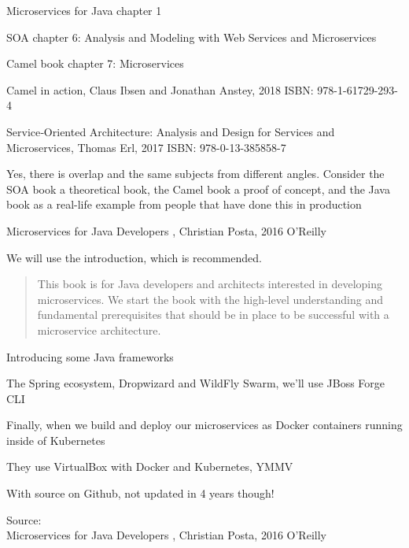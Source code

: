 \documentclass[Screen16to9,17pt]{foils}
\begin{document}
\begin{list1}
\item Microservices for Java chapter 1
\item SOA chapter 6: Analysis and Modeling with Web Services and Microservices
\item Camel book chapter 7: Microservices
\vskip 1cm

\end{list1}

Camel in action, Claus Ibsen and Jonathan Anstey, 2018
ISBN: 978-1-61729-293-4

Service‑Oriented Architecture: Analysis and Design for Services and Microservices, Thomas Erl, 2017
ISBN: 978-0-13-385858-7

Yes, there is overlap and the same subjects from different angles. Consider the SOA book a theoretical book, the Camel book a proof of concept, and the Java book as a real-life example from people that have done this in production



Microservices for Java Developers , Christian Posta, 2016 O’Reilly\\

We will use the introduction, which is recommended.


\begin{quote}
This book is for Java developers and architects interested in developing microservices. We start the book with the high-level understanding and fundamental prerequisites that should be in place to be successful with a microservice architecture.
\end{quote}

Introducing some Java frameworks
\begin{list2}
\item The Spring ecosystem, Dropwizard and WildFly Swarm, we’ll use JBoss Forge CLI
\item Finally, when we build and deploy our microservices as Docker containers running inside of Kubernetes
\item They use VirtualBox with Docker and Kubernetes, YMMV
\item With source on Github, not updated in 4 years though!\\
\end{list2}
Source: {\footnotesize\\
Microservices for Java Developers , Christian Posta, 2016 O’Reilly}
\end{document}
